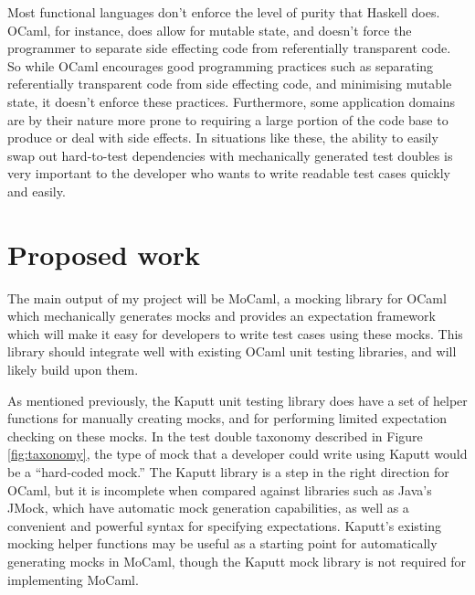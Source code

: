 \documentclass[proposal]{softeng}
\begin{document}
Most functional languages don't enforce the level of purity that
Haskell does. OCaml, for instance, does allow for mutable state, and
doesn't force the programmer to separate side effecting code from
referentially transparent code. So while OCaml encourages good
programming practices such as separating referentially transparent
code from side effecting code, and minimising mutable state, it
doesn't enforce these practices. Furthermore, some application domains
are by their nature more prone to requiring a large portion of the
code base to produce or deal with side effects. In situations like
these, the ability to easily swap out hard-to-test dependencies with
mechanically generated test doubles is very important to the developer
who wants to write readable test cases quickly and easily.

\section{Proposed work}


The main output of my project will be MoCaml, a mocking library for
OCaml which mechanically generates mocks and provides an expectation
framework which will make it easy for developers to write test cases
using these mocks. This library should integrate well with existing
OCaml unit testing libraries, and will likely build upon them.

As mentioned previously, the Kaputt unit testing library does have a
set of helper functions for manually creating mocks, and for
performing limited expectation checking on these mocks. In the test
double taxonomy described in Figure \ref{fig:taxonomy}, the type of
mock that a developer could write using Kaputt would be a ``hard-coded
mock.'' The Kaputt library is a step in the right direction for OCaml,
but it is incomplete when compared against libraries such as Java's
JMock, which have automatic mock generation capabilities, as well as a
convenient and powerful syntax for specifying expectations. Kaputt's
existing mocking helper functions may be useful as a starting point
for automatically generating mocks in MoCaml, though the Kaputt mock
library is not required for implementing MoCaml.
\end{document}
